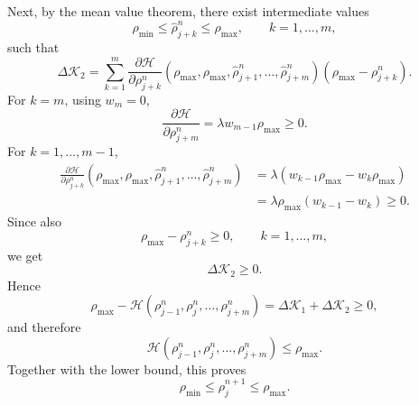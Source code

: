 Next, by the mean value theorem, there exist intermediate values
\[
    \rho_{\min}\le \widehat\rho_{j+k}^n\le \rho_{\max},
    \qquad k=1,\dots,m,
\]
such that
\[
    \Delta \mathcal K_2
    =
    \sum_{k=1}^m
    \frac{\partial \mathcal H}{\partial \rho_{j+k}^n}
    (\rho_{\max},\rho_{\max},
    \widehat\rho_{j+1}^n,\dots,\widehat\rho_{j+m}^n)
    (\rho_{\max}-\rho_{j+k}^n).
\]
For \(k=m\), using \(w_m=0\),
\[
    \frac{\partial \mathcal H}{\partial \rho_{j+m}^n}
    =
    \lambda w_{m-1}\rho_{\max}\ge 0.
\]
For \(k=1,\dots,m-1\),
\[
    \begin{aligned}
        \frac{\partial \mathcal H}{\partial \rho_{j+k}^n}
        (\rho_{\max},\rho_{\max},
        \widehat\rho_{j+1}^n,\dots,\widehat\rho_{j+m}^n)
         & =
        \lambda(w_{k-1}\rho_{\max}-w_k\rho_{\max})
        \\
         & =
        \lambda\rho_{\max}(w_{k-1}-w_k)
        \ge 0.
    \end{aligned}
\]
Since also
\[
    \rho_{\max}-\rho_{j+k}^n\ge 0,
    \qquad k=1,\dots,m,
\]
we get
\[
    \Delta \mathcal K_2\ge 0.
\]
Hence
\[
    \rho_{\max}
    -
    \mathcal H(\rho_{j-1}^n,\rho_j^n,\dots,\rho_{j+m}^n)
    =
    \Delta \mathcal K_1+\Delta \mathcal K_2
    \ge 0,
\]
and therefore
\[
    \mathcal H(\rho_{j-1}^n,\rho_j^n,\dots,\rho_{j+m}^n)
    \le \rho_{\max}.
\]
Together with the lower bound, this proves
\[
    \rho_{\min}\le \rho_j^{n+1}\le \rho_{\max}.
\]

